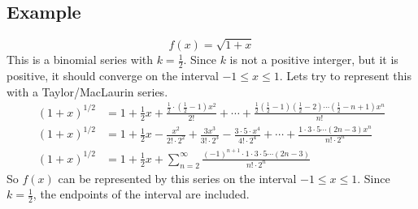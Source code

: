 \documentclass{report}
\begin{document}
    \subsection{Example}
        \[f(x) = \sqrt{1+x}\]
        This is a binomial series with \(k = \frac{1}{2}\).
        Since \(k\) is not a positive interger, but it is positive, it should converge on the interval \(-1 \leq x \leq 1\).
        Lets try to represent this with a Taylor/MacLaurin series. 
        \begin{align*}
            (1+x)^{1/2} &= 1 + \frac{1}{2}x + \frac{\frac{1}{2} \cdot (\frac{1}{2} - 1)x^2}{2!} + \cdots + \frac{\frac{1}{2}(\frac{1}{2}-1)(\frac{1}{2}-2) \cdots (\frac{1}{2} - n + 1)x^n}{n!} \\
            (1+x)^{1/2} &= 1 + \frac{1}{2}x - \frac{x^2}{2! \cdot 2^2} + \frac{3x^3}{3! \cdot 2^3} - \frac{3 \cdot 5 \cdot x^4}{4! \cdot 2^4} + \cdots + \frac{1 \cdot 3 \cdot 5 \cdots (2n-3)x^n}{n! \cdot 2^n} \\
            (1+x)^{1/2} &= 1 + \frac{1}{2}x + \sum_{n=2}^{\infty} \frac{(-1)^{n+1} \cdot 1 \cdot 3 \cdot 5 \cdots (2n-3)}{n! \cdot 2^n}
        \end{align*}
        So \(f(x)\) can be represented by this series on the interval \(-1 \leq x \leq 1\).
        Since \(k = \frac{1}{2}\), the endpoints of the interval are included.
\end{document}

